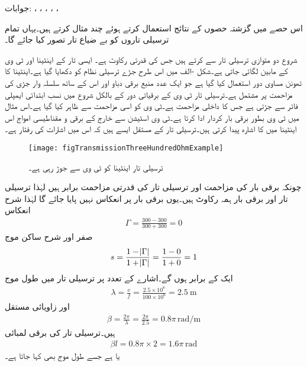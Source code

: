 جوابات: ، ، ، ، ، 

اس حصے میں گزشتہ حصوں کے نتائج استعمال کرتے ہوئے چند مثال کرتے ہیں۔یہاں تمام ترسیلی تاروں کو بے ضیاع تار تصور کیا جائے گا۔

شروع دو متوازی ترسیلی تار سے کرتے ہیں جس کی قدرتی رکاوٹ  ہے۔ ایسی تار  کے اینٹینا اور ٹی وی کے مابین لگائی جاتی ہے۔شکل -الف میں اس طرح جڑے ترسیلی نظام کو دکھایا گیا ہے۔اینٹینا کا تھونن مساوی دور استعمال کیا گیا ہے جو ایک عدد منبع برقی دباو  اور اس کے ساتھ سلسلہ وار  جڑی  کی مزاحمت پر مشتمل ہے۔ترسیلی تار ٹی وی کے برقیاتی دور کے بالکل شروع میں نسب ابتدائی ایمپلی فائر سے جڑتی ہے جس کا داخلی مزاحمت  ہے۔ٹی وی کو اسی مزاحمت سے ظاہر کیا گیا ہے۔اس مثال میں ٹی وی بطور برقی بار کردار ادا کرتا ہے۔ٹی وی اسٹیشن سے خارج  کے برقی و مقناطیسی امواج اس اینٹینا میں  کا اشارہ پیدا کرتی ہیں۔ترسیلی تار کے مستقل ایسے ہیں کہ اس میں اشارات کی رفتار  ہے۔

\begin{figure}
\centering
\texttt{[image: figTransmissionThreeHundredOhmExample]}
\caption{ترسیلی تار اینٹینا کو ٹی وی سے جوڑ رہی ہے۔}
\label{شکل_ترسیلی_اینٹینا_تا_ٹی_وی}
\end{figure}

چونکہ برقی بار کی مزاحمت اور ترسیلی تار کی قدرتی مزاحمت برابر ہیں لہٰذا ترسیلی تار اور برقی بار ہمہ رکاوٹ ہیں۔یوں برقی بار پر انعکاس نہیں پایا جائے گا لہٰذا شرح انعکاس
\begin{align*}
\Gamma=\frac{300-300}{300+300}=0
\end{align*}
 صفر اور شرح ساکن موج
\begin{align*}
s=\frac{1-\abs{\Gamma}}{1+\abs{\Gamma}}=\frac{1-0}{1+0}=1
\end{align*}
ایک کے برابر ہوں گے۔اشارے کے تعدد پر ترسیلی تار میں طول موج
\begin{align*}
\lambda=\frac{v}{f}=\frac{2.5 \times 10^8}{100\times 10^6}=\SI{2.5}{\meter}
\end{align*}
اور زاویائی مستقل
\begin{align*}
\beta=\frac{2\pi}{\lambda}=\frac{2\pi}{2.5}=0.8 \pi\, \si{\radian \per \meter}
\end{align*}
 ہیں۔ترسیلی تار کی برقی لمبائی
\begin{align*}
\beta l =0.8 \pi \times 2=1.6 \pi \, \si{\radian}
\end{align*} 
یا  ہے جسے  طول موج بھی کہا جاتا ہے۔ 

